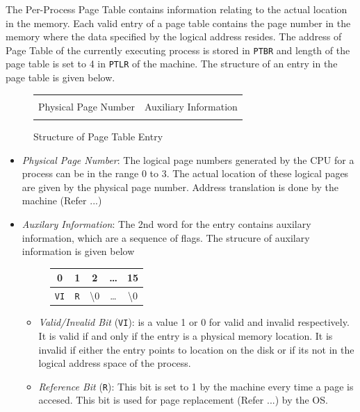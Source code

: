 \documentclass[10pt]{report}
\begin{document}
 The Per-Process Page Table contains information relating to the actual location in the memory. Each valid entry of a page table contains the page number in the memory where the data specified by the logical address resides. The address of Page Table of the currently executing process is stored in \texttt{PTBR} and length of the page table is set to 4 in \texttt{PTLR} of the machine. The structure of an entry in the page table is given below.

		\begin{figure}[htp!]
		\centering
		\begin{tabular}{|c|c|}
		\hline
		  	 	& 			\\ 
		 	Physical Page Number & Auxiliary Information  \\
			 	& 			\\  \hline
		\end{tabular}
		\caption{Structure of Page Table Entry}
	\end{figure}

\begin{itemize}
	\item \textit{Physical Page Number}: The logical page numbers generated by the CPU for a process can be in the range 0 to 3. The actual location of these logical pages are given by the physical page number. Address translation is done by the machine (Refer ...)
	
	\item \textit{Auxilary Information}: The 2nd word for the entry contains auxilary information, which are a sequence of flags. The strucure of auxilary information is given below
			\begin{figure}[htp!]
		\centering
		\begin{tabular}{|c|c|c|c|c|}
		0 & 1 & 2 & \ldots & 15 \\
		\hline
		\texttt{VI} & \texttt{R} & \textbackslash 0 & \ldots &  \textbackslash 0 \\
		\hline
		\end{tabular}
		\end{figure}
	
		\begin{itemize}
			\item \textit{Valid/Invalid Bit} (\texttt{VI}): is a value 1 or 0 for valid and invalid respectively. It is valid if and only if the entry is a physical memory location. It is invalid if either the entry points to location on the disk or if its not in the logical address space of the process.
			\item \textit{Reference Bit} (\texttt{R}): This bit is set to 1 by the machine every time a page is accesed. This bit is used for page replacement (Refer ...) by the OS. 
		\end{itemize}

\end{itemize}
	
\end{document}

